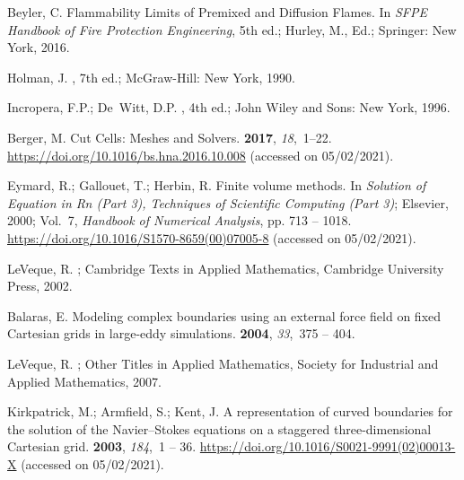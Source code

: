 \documentclass[atmosphere,article,accept,moreauthors,pdftex]{Definitions/mdpi}
\begin{document}
\begin{thebibliography}{999}
Beyler, C.
\newblock Flammability Limits of Premixed and Diffusion Flames. In {\em SFPE
  Handbook of Fire Protection Engineering}, 5th ed.;  Hurley, M., Ed.;
  Springer: New York,  2016.

Holman, J.
, 7th ed.; McGraw-Hill: New York,  1990.

Incropera, F.P.; De~Witt, D.P.
, 4th ed.; John Wiley and
  Sons: New York,  1996.

Berger, M.
\newblock Cut Cells: Meshes and Solvers.
 {\bf 2017}, {\em 18},~1--22.
\newblock
  \href{https://doi.org/10.1016/bs.hna.2016.10.008}{https://doi.org/10.1016/bs.hna.2016.10.008} (accessed on 05/02/2021).

Eymard, R.; Gallouet, T.; Herbin, R.
\newblock Finite volume methods. In {\em Solution of Equation in Rn (Part 3),
  Techniques of Scientific Computing (Part 3)}; Elsevier,  2000; Vol.~7, {\em
  Handbook of Numerical Analysis}, pp. 713 -- 1018.
\newblock
  \href{https://doi.org/10.1016/S1570-8659(00)07005-8}{https://doi.org/10.1016/S1570-8659(00)07005-8} (accessed on 05/02/2021).

LeVeque, R.
; Cambridge Texts
  in Applied Mathematics, Cambridge University Press,  2002.

Balaras, E.
\newblock Modeling complex boundaries using an external force field on fixed
  Cartesian grids in large-eddy simulations.
 {\bf 2004}, {\em 33},~375 -- 404.

LeVeque, R.
; Other Titles in Applied
  Mathematics, Society for Industrial and Applied Mathematics,  2007.

Kirkpatrick, M.; Armfield, S.; Kent, J.
\newblock A representation of curved boundaries for the solution of the
  Navier--Stokes equations on a staggered three-dimensional Cartesian grid.
 {\bf 2003}, {\em 184},~1 --
  36.
\newblock
  \href{https://doi.org/10.1016/S0021-9991(02)00013-X}{https://doi.org/10.1016/S0021-9991(02)00013-X} (accessed on 05/02/2021).


\end{thebibliography}
\end{document}
